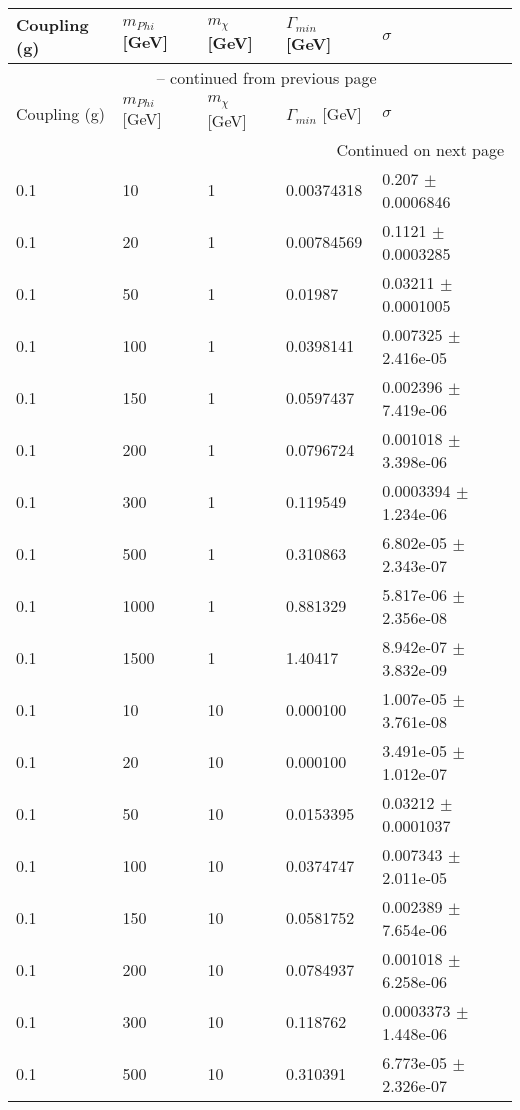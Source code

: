 \begin{longtable}{lllll}
\toprule
Coupling (g) & $m_{Phi}$ [GeV] & $m_{\chi}$ [GeV] & $\Gamma_{min}$ [GeV] & $\sigma$\\
\midrule
\endfirsthead

\multicolumn{5}{c}{\tablename\ \thetable{} -- continued from previous page} \\
Coupling (g) & $m_{Phi}$ [GeV] & $m_{\chi}$ [GeV] & $\Gamma_{min}$ [GeV] & $\sigma$\\
\midrule
\endhead

\midrule
\multicolumn{5}{r}{{Continued on next page}} \\ 
\endfoot

\bottomrule
\endlastfoot

 0.1 &    10 &     1 & 0.00374318 &    0.207 $\pm$ 0.0006846 \\
 0.1 &    20 &     1 & 0.00784569 &   0.1121 $\pm$ 0.0003285 \\
 0.1 &    50 &     1 &  0.01987 &  0.03211 $\pm$ 0.0001005 \\
 0.1 &   100 &     1 & 0.0398141 & 0.007325 $\pm$ 2.416e-05 \\
 0.1 &   150 &     1 & 0.0597437 & 0.002396 $\pm$ 7.419e-06 \\
 0.1 &   200 &     1 & 0.0796724 & 0.001018 $\pm$ 3.398e-06 \\
 0.1 &   300 &     1 & 0.119549 & 0.0003394 $\pm$ 1.234e-06 \\
 0.1 &   500 &     1 & 0.310863 & 6.802e-05 $\pm$ 2.343e-07 \\
 0.1 &  1000 &     1 & 0.881329 & 5.817e-06 $\pm$ 2.356e-08 \\
 0.1 &  1500 &     1 &  1.40417 & 8.942e-07 $\pm$ 3.832e-09 \\
 0.1 &    10 &    10 & 0.000100 & 1.007e-05 $\pm$ 3.761e-08 \\
 0.1 &    20 &    10 & 0.000100  & 3.491e-05 $\pm$ 1.012e-07 \\
 0.1 &    50 &    10 & 0.0153395 &  0.03212 $\pm$ 0.0001037 \\
 0.1 &   100 &    10 & 0.0374747 & 0.007343 $\pm$ 2.011e-05 \\
 0.1 &   150 &    10 & 0.0581752 & 0.002389 $\pm$ 7.654e-06 \\
 0.1 &   200 &    10 & 0.0784937 & 0.001018 $\pm$ 6.258e-06 \\
 0.1 &   300 &    10 & 0.118762 & 0.0003373 $\pm$ 1.448e-06 \\
 0.1 &   500 &    10 & 0.310391 & 6.773e-05 $\pm$ 2.326e-07 \\

\end{longtable}
